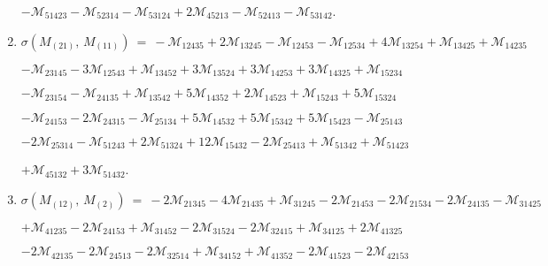 \documentclass[12pt]{article}
\newcommand{\M}{\mathcal{M}}
\begin{document}
\begin{enumerate}
      \hspace{10pt}
      $-\M_{51423} -\M_{52314} 
       -\M_{53124} +2\M_{45213} 
       -\M_{52413} -\M_{53142} $.\vspace{-8pt}
\item[]\hspace{-50pt}$\sigma(M_{(21)},\,M_{(11)})\ =\ 
        -\M_{12435} +2\M_{13245} 
       -\M_{12453} -\M_{12534} 
       +4\M_{13254} +\M_{13425} 
       +\M_{14235} $\vspace{-6pt}

      \hspace{10pt}
      $-\M_{23145} 
       -3\M_{12543} +\M_{13452} 
       +3\M_{13524} +3\M_{14253} 
       +3\M_{14325} +\M_{15234} $\vspace{-6pt}

      \hspace{10pt}
      $-\M_{23154} -\M_{24135} 
       +\M_{13542} +5\M_{14352} 
       +2\M_{14523} +\M_{15243} 
       +5\M_{15324} $\vspace{-6pt}

      \hspace{10pt}
      $-\M_{24153} 
       -2\M_{24315} -\M_{25134} 
       +5\M_{14532} +5\M_{15342} 
       +5\M_{15423} -\M_{25143} $\vspace{-6pt}

      \hspace{10pt}
      $-2\M_{25314} -\M_{51243} 
       +2\M_{51324} +12\M_{15432} 
       -2\M_{25413} +\M_{51342} 
       +\M_{51423} $\vspace{-6pt}

      \hspace{10pt}
      $+\M_{45132} 
       +3\M_{51432} $.\vspace{-8pt}
\item[]\hspace{-50pt}$\sigma(M_{(12)},\,M_{(2)})\ =\ 
        -2\M_{21345} -4\M_{21435} 
       +\M_{31245} -2\M_{21453} 
       -2\M_{21534} -2\M_{24135} 
       -\M_{31425} $\vspace{-6pt}

      \hspace{10pt}
      $+\M_{41235} 
       -2\M_{24153} +\M_{31452} 
       -2\M_{31524} -2\M_{32415} 
       +\M_{34125} +2\M_{41325} $\vspace{-6pt}

      \hspace{10pt}
      $-2\M_{42135} -2\M_{24513} 
       -2\M_{32514} +\M_{34152} 
       +\M_{41352} -2\M_{41523} 
       -2\M_{42153} $\vspace{-6pt}


\end{enumerate}
\end{document}
